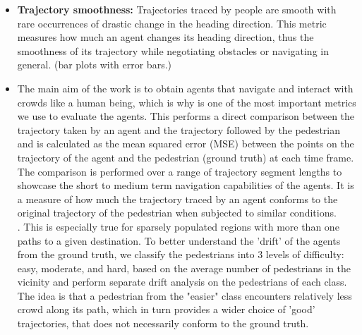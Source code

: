 \begin{itemize}
        \item \textbf{Trajectory smoothness:} Trajectories traced by people are smooth with rare occurrences of drastic change in the heading direction. This metric measures how much an agent changes its heading direction, thus the smoothness of its trajectory while negotiating obstacles or navigating in general. (bar plots with error bars.)
        \item \textbf{}The main aim of the work is to obtain agents that navigate and interact with crowds like a human being, which is why  is one of the most important metrics we use to evaluate the agents. This performs a direct comparison between the trajectory taken by an agent and the trajectory followed by the pedestrian and is calculated as the mean squared error (MSE) between the points on the trajectory of the agent and the pedestrian (ground truth) at each time frame. The comparison is performed over a range of trajectory segment lengths to showcase the short to medium term navigation capabilities of the agents. It is a measure of how much the trajectory traced by an agent conforms to the original trajectory of the pedestrian when subjected to similar conditions.\\
        . This is especially true for sparsely populated regions with more than one paths to a given destination. To better understand the 'drift' of the agents from the ground truth, we classify the pedestrians into 3 levels of difficulty: easy, moderate, and hard, based on the average number of pedestrians in the vicinity and perform separate drift analysis on the pedestrians of each class. The idea is that a pedestrian from the "easier" class encounters relatively less crowd along its path, which in turn provides a wider choice of 'good' trajectories, that does not necessarily conform to the ground truth.

\end{itemize}
